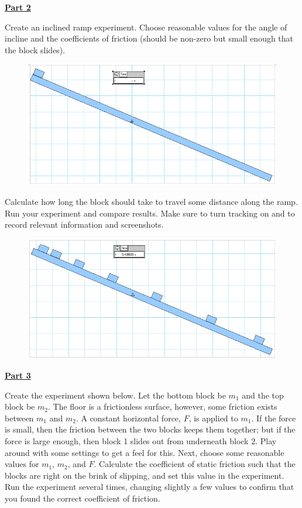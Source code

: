 \underline{\textbf{Part 2}} \par
Create an inclined ramp experiment.
Choose reasonable values for the angle of incline and the coefficients of friction (should be non-zero but small enough that the block slides). 
%
\begin{figure}[H]
\includegraphics[scale=0.70]{figures/forces/fig2a.png}
\end{figure}
%
Calculate how long the block should take to travel some distance along the ramp.
Run your experiment and compare results.
Make sure to turn tracking on and to record relevant information and screenshots.
%
\begin{figure}[H]
\includegraphics[scale=0.70]{figures/forces/fig2b.png}
\end{figure}

\underline{\textbf{Part 3}} \par
Create the experiment shown below.
Let the bottom block be $m_1$ and the top block be $m_2$.
The floor is a frictionless surface, however, some friction exists between $m_1$ and $m_2$.
A constant horizontal force, $F$, is applied to $m_1$.
If the force is small, then the friction between the two blocks keeps them together; but if the force is large enough, then block 1 slides out from underneath block 2.
Play around with some settings to get a feel for this.
Next, choose some reasonable values for $m_1$, $m_2$, and $F$.
Calculate the coefficient of static friction such that the blocks are right on the brink of slipping, and set this value in the experiment.
Run the experiment several times, changing slightly a few values to confirm that you found the correct coefficient of friction.

